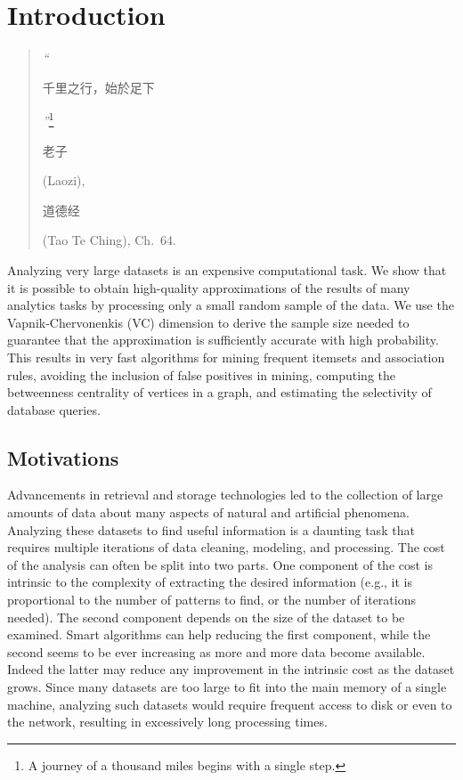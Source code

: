 \chapter{Introduction}\label{ch:intro}
\begin{quote}
  \begin{flushright}
    {\em``}
    \begin{CJK*}{UTF8}{bsmi}千里之行，始於足下\end{CJK*}
    {\em''}\footnote{A journey of a thousand miles
    begins with a single step.}\\\begin{CJK*}{UTF8}{bsmi}老子\end{CJK*} (Laozi), \begin{CJK*}{UTF8}{bsmi}道德经\end{CJK*} (Tao Te Ching), Ch.~64.
  \end{flushright}
\end{quote}

 Analyzing very large datasets is an expensive
computational task. We show that it is possible to obtain high-quality
approximations of the results of many analytics tasks by processing only a small
random sample of the data. We use the Vapnik-Chervonenkis (VC) dimension to
derive the sample size needed to guarantee that the approximation is
sufficiently accurate with high probability. This results in very fast
algorithms for mining frequent itemsets and association rules, avoiding the
inclusion of false positives in mining, computing the betweenness centrality of
vertices in a graph, and estimating the selectivity of database queries.

\section{Motivations}
Advancements in retrieval and storage technologies led to the collection of
large amounts of data about many aspects of natural and artificial phenomena.
Analyzing these datasets to find useful information is a daunting task that
requires multiple iterations of data cleaning, modeling, and processing. The
cost of the analysis can often be split into two parts. One component of the
cost is intrinsic to the complexity of extracting the desired information (e.g.,
it is proportional to the number of patterns to find, or the number of iterations
needed). The second component depends on the size of the dataset to be examined.
Smart algorithms can help reducing the first component, while the second seems
to be ever increasing as more and more data become available. Indeed the latter
may reduce any improvement in the intrinsic cost as the dataset grows. Since
many datasets are too large to fit into the main memory of a single machine,
analyzing such datasets would require frequent access to disk or even to the
network, resulting in excessively long processing times.

